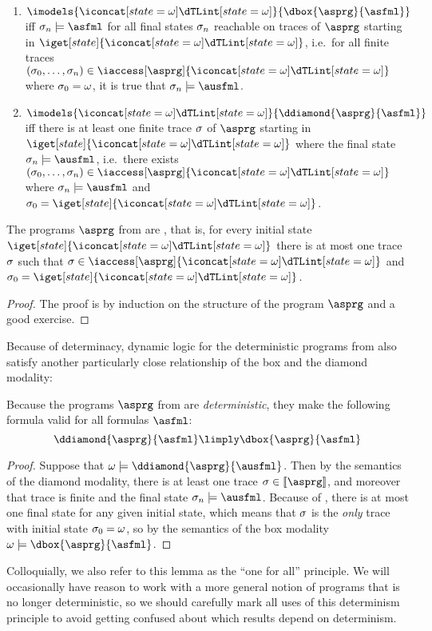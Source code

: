 \documentclass[11pt,twoside]{scrartcl}
\begin{document}
\begin{definition}
\begin{enumerate}
\item \(\imodels{\I}{\dbox{\asprg}{\asfml}}\) iff \(\atrace_n \models \asfml\) for all final states $\sigma_n$ reachable on traces of $\asprg$ starting in $\iget[state]{\I}$, i.e.\ for all finite traces \((\atrace_0, \ldots, \atrace_n) \in \iaccess[\asprg]{\I}\) where $\sigma_0 = \omega$, it is true that \(\atrace_n \models \ausfml\).

\item \(\imodels{\I}{\ddiamond{\asprg}{\asfml}}\) iff there is at least one finite trace $\sigma$ of $\asprg$ starting in $\iget[state]{\I}$ where the final state $\atrace_n \models \ausfml$, i.e.\ there exists \((\atrace_0, \ldots, \atrace_n) \in \iaccess[\asprg]{\I}\) where \(\atrace_n \models \ausfml\) and \(\atrace_0 = \iget[state]{\I}\).
\end{enumerate}
\end{definition}

\begin{lemma}[Determinism] \label{lem:determinism}
  The programs $\asprg$ from  are , that is, for every initial state $\iget[state]{\I}$ there is at most one trace $\sigma$ such that $\sigma \in \iaccess[\asprg]{\I}$ and $\sigma_0 = \iget[state]{\I}$.
\end{lemma}
\begin{proof}
The proof is by induction on the structure of the program $\asprg$ and a good exercise.
\end{proof}


Because of determinacy, dynamic logic for the deterministic programs from  also satisfy another particularly close relationship of the box and the diamond modality:
\begin{lemma}
  Because the programs $\asprg$ from  are \emph{deterministic}, they make the following formula valid for all formulas $\asfml$:
  \[
  \ddiamond{\asprg}{\asfml} \limply \dbox{\asprg}{\asfml}
  \]
\end{lemma}
\begin{proof}
Suppose that $\omega \models \ddiamond{\asprg}{\ausfml}$. Then by the semantics of the diamond modality, there is at least one trace $\atrace \in \llbracket\asprg\rrbracket$, and moreover that trace is finite and the final state $\atrace_n \models \ausfml$. Because of , there is at most one final state for any given initial state, which means that $\sigma$ is the \emph{only} trace with initial state $\sigma_0 = \omega$, so by the semantics of the box modality $\omega \models \dbox{\asprg}{\asfml}$.
\end{proof}
Colloquially, we also refer to this lemma as the ``one for all'' principle.
We will occasionally have reason to work with a more general notion of programs that is no longer deterministic, so we should carefully mark all uses of this determinism principle to avoid getting confused about which results depend on determinism.
\end{document}
